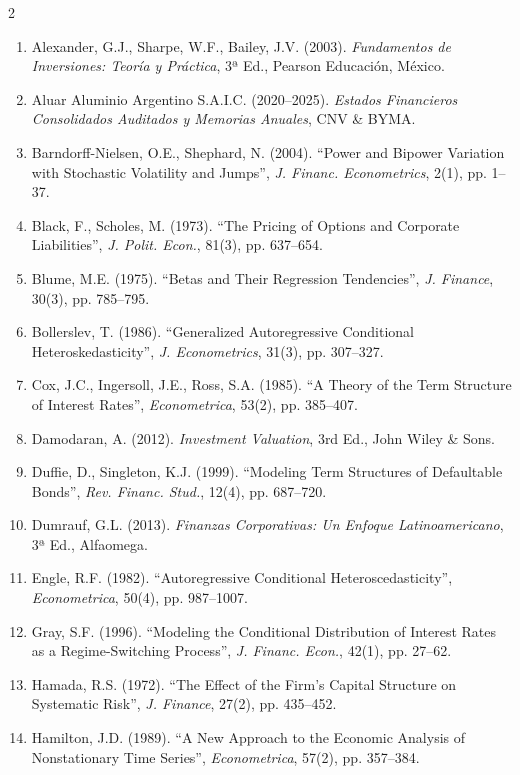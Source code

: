 \documentclass[11pt,a4paper]{article}
\begin{document}
\begin{multicols}{2}
\begin{enumerate}
    \tiny
    \item Alexander, G.J., Sharpe, W.F., Bailey, J.V. (2003). \textit{Fundamentos de Inversiones: Teoría y Práctica}, 3ª Ed., Pearson Educación, México.
    \item Aluar Aluminio Argentino S.A.I.C. (2020–2025). \textit{Estados Financieros Consolidados Auditados y Memorias Anuales}, CNV \& BYMA.
    \item Barndorff-Nielsen, O.E., Shephard, N. (2004). ``Power and Bipower Variation with Stochastic Volatility and Jumps'', \textit{J. Financ. Econometrics}, 2(1), pp. 1--37.
    \item Black, F., Scholes, M. (1973). ``The Pricing of Options and Corporate Liabilities'', \textit{J. Polit. Econ.}, 81(3), pp. 637--654.
    \item Blume, M.E. (1975). ``Betas and Their Regression Tendencies'', \textit{J. Finance}, 30(3), pp. 785--795.
    \item Bollerslev, T. (1986). ``Generalized Autoregressive Conditional Heteroskedasticity'', \textit{J. Econometrics}, 31(3), pp. 307--327.
    \item Cox, J.C., Ingersoll, J.E., Ross, S.A. (1985). ``A Theory of the Term Structure of Interest Rates'', \textit{Econometrica}, 53(2), pp. 385--407.
    \item Damodaran, A. (2012). \textit{Investment Valuation}, 3rd Ed., John Wiley \& Sons.
    \item Duffie, D., Singleton, K.J. (1999). ``Modeling Term Structures of Defaultable Bonds'', \textit{Rev. Financ. Stud.}, 12(4), pp. 687--720.
    \item Dumrauf, G.L. (2013). \textit{Finanzas Corporativas: Un Enfoque Latinoamericano}, 3ª Ed., Alfaomega.
    \item Engle, R.F. (1982). ``Autoregressive Conditional Heteroscedasticity'', \textit{Econometrica}, 50(4), pp. 987--1007.
    \item Gray, S.F. (1996). ``Modeling the Conditional Distribution of Interest Rates as a Regime-Switching Process'', \textit{J. Financ. Econ.}, 42(1), pp. 27--62.
    \item Hamada, R.S. (1972). ``The Effect of the Firm's Capital Structure on Systematic Risk'', \textit{J. Finance}, 27(2), pp. 435--452.
    \item Hamilton, J.D. (1989). ``A New Approach to the Economic Analysis of Nonstationary Time Series'', \textit{Econometrica}, 57(2), pp. 357--384.

\end{enumerate}
\end{multicols}
\end{document}
